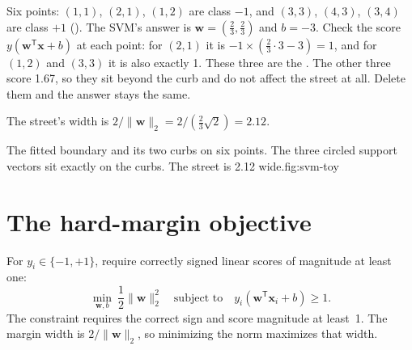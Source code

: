 \begin{workedexample}
Six points: $(1,1)$, $(2,1)$, $(1,2)$ are class $-1$, and $(3,3)$, $(4,3)$, $(3,4)$ are class $+1$ (). The SVM's answer is $\bm{w}=(\tfrac23,\tfrac23)$ and $b=-3$. Check the score $y(\bm{w}^{\mathsf T}\bm{x}+b)$ at each point: for $(2,1)$ it is $-1\times(\tfrac23\cdot3-3)=1$, and for $(1,2)$ and $(3,3)$ it is also exactly 1. These three are the . The other three score 1.67, so they sit beyond the curb and do not affect the street at all. Delete them and the answer stays the same.

The street's width is $2/\|\bm{w}\|_2=2/(\tfrac23\sqrt2)=2.12$.
\end{workedexample}

\begin{utpfig}{The fitted boundary and its two curbs on six points. The three circled support vectors sit exactly on the curbs. The street is 2.12 wide.}{fig:svm-toy}
\end{utpfig}

\section{The hard-margin objective}

For $y_i\in\{-1,+1\}$, require correctly signed linear scores of magnitude at least one:
\[
  \min_{\bm{w},b}\ \frac{1}{2}\|\bm{w}\|_2^2
  \quad\text{subject to}\quad
  y_i(\bm{w}^{\mathsf T}\bm{x}_i+b)\geq 1 .
\]
The constraint requires the correct sign and score magnitude at least~1. The margin width is $2/\|\bm w\|_2$, so minimizing the norm maximizes that width.

